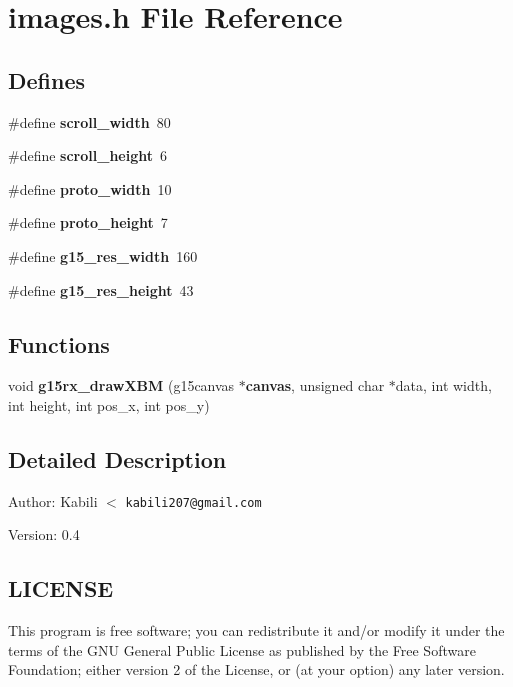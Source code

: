 \section{images.h File Reference}
\label{images_8h}
\subsection*{Defines}
\begin{CompactItemize}
\item 
\#define {\bf scroll\_\-width}~80
\item 
\#define {\bf scroll\_\-height}~6
\item 
\#define {\bf proto\_\-width}~10
\item 
\#define {\bf proto\_\-height}~7
\item 
\#define {\bf g15\_\-res\_\-width}~160
\item 
\#define {\bf g15\_\-res\_\-height}~43
\end{CompactItemize}
\subsection*{Functions}
\begin{CompactItemize}
\item 
void {\bf g15rx\_\-drawXBM} (g15canvas $\ast${\bf canvas}, unsigned char $\ast$data, int width, int height, int pos\_\-x, int pos\_\-y)
\end{CompactItemize}


\subsection{Detailed Description}
\begin{Desc}
\item[Author:]Kabili $<$ {\tt kabili207@gmail.com} \end{Desc}
\begin{Desc}
\item[Version:]0.4\end{Desc}
\subsection{LICENSE}\label{main_LICENSE}
This program is free software; you can redistribute it and/or modify it under the terms of the GNU General Public License as published by the Free Software Foundation; either version 2 of the License, or (at your option) any later version.


